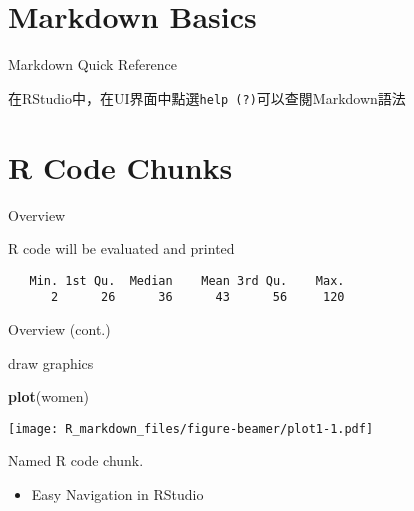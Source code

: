 \documentclass[ignorenonframetext,]{beamer}
\newenvironment{Shaded}{\begin{snugshade}}{\end{snugshade}}
\newcommand{\KeywordTok}[1]{\textcolor[rgb]{0.13,0.29,0.53}{\textbf{#1}}}
\newcommand{\OperatorTok}[1]{\textcolor[rgb]{0.81,0.36,0.00}{\textbf{#1}}}
\newcommand{\NormalTok}[1]{#1}
\providecommand{\tightlist}{%
  \setlength{\itemsep}{0pt}\setlength{\parskip}{0pt}}
\begin{document}
\section{Markdown Basics}\label{markdown-basics}

\begin{frame}[fragile]{Markdown Quick Reference}

在RStudio中，在UI界面中點選\texttt{help\ (?)}可以查閱Markdown語法\\

\end{frame}

\section{R Code Chunks}\label{r-code-chunks-1}

\begin{frame}[fragile]{Overview}

R code will be evaluated and printed

\begin{Shaded}
\end{Shaded}

\begin{verbatim}
   Min. 1st Qu.  Median    Mean 3rd Qu.    Max. 
      2      26      36      43      56     120 
\end{verbatim}

\end{frame}

\begin{frame}[fragile]{Overview (cont.)}

draw graphics

\begin{Shaded}
\begin{Highlighting}[]
\KeywordTok{plot}\NormalTok{(women)  }
\end{Highlighting}
\end{Shaded}

\texttt{[image: R\_markdown\_files/figure-beamer/plot1-1.pdf]}

\end{frame}

\begin{frame}{Named R code chunk.}

\begin{itemize}
\tightlist
\item
  Easy Navigation in RStudio
\end{itemize}

\end{frame}
\end{document}
